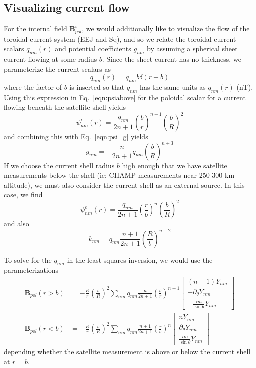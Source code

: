 \documentclass{article}
\newcommand{\B}{\mathbf{B}}
\newcommand{\q}{q_{nm}}
\begin{document}
\subsection{Visualizing current flow}

For the internal field $\B_{pol}^i$, we would additionally like to visualize the flow of the
toroidal current system (EEJ and Sq), and so we relate the toroidal current scalars $\q(r)$
and potential coefficients $g_{nm}$ by assuming a spherical sheet current flowing at some radius
$b$. Since the sheet current has no thickness, we parameterize the current scalars as
\begin{equation}
\q(r) = \q b \delta(r - b)
\label{eqn:qnm}
\end{equation}
where the factor of $b$ is inserted so that $\q$ has the same units as $\q(r)$ (nT).
Using this expression in Eq.~\eqref{eqn:psiabove} for the poloidal scalar for a current
flowing beneath the satellite shell yields
\begin{equation}
\psi_{nm}^i(r) = \frac{\q}{2n + 1} \left( \frac{b}{r} \right)^{n+1} \left( \frac{b}{R} \right)^2
\label{eqn:psi_q}
\end{equation}
and combining this with Eq.~\eqref{eqn:psi_g} yields
\begin{equation}
g_{nm} = -\frac{n}{2n+1} \q \left( \frac{b}{R} \right)^{n+3}
\label{eqn:g_q}
\end{equation}
If we choose the current shell radius $b$ high enough that we have satellite measurements
below the shell (ie: CHAMP measurements near 250-300 km altitude), we must also consider
the current shell as an external source. In this case, we find
\begin{equation}
\psi_{nm}^e(r) = \frac{\q}{2n + 1} \left( \frac{r}{b} \right)^n \left( \frac{b}{R} \right)^2
\label{eqn:psie_q}
\end{equation}
and also
\begin{equation}
k_{nm} = q_{nm} \frac{n+1}{2n + 1} \left( \frac{R}{b} \right)^{n-2}
\end{equation}

To solve for the $\q$ in the least-squares inversion, we would use the parameterizations
\begin{align}
\B_{pol}(r > b) &= -\frac{R}{r} \left( \frac{b}{R} \right)^2 \sum_{nm} \q \frac{n}{2n + 1}
\left( \frac{b}{r} \right)^{n+1}
\left[
\begin{array}{c}
(n+1) Y_{nm} \\
-\partial_{\theta} Y_{nm} \\
-\frac{im}{\sin{\theta}} Y_{nm}
\end{array}
\right] \\
\B_{pol}(r < b) &= -\frac{R}{r} \left( \frac{b}{R} \right)^2 \sum_{nm} \q \frac{n+1}{2n + 1}
\left( \frac{r}{b} \right)^n
\left[
\begin{array}{c}
n Y_{nm} \\
\partial_{\theta} Y_{nm} \\
\frac{im}{\sin{\theta}} Y_{nm}
\end{array}
\right]
\end{align}
depending whether the satellite measurement is above or below the current shell at $r = b$.
\end{document}
